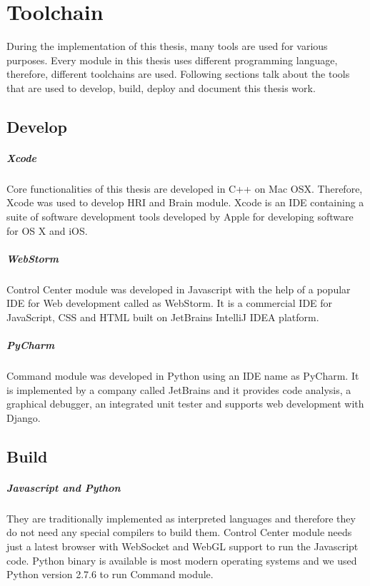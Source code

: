 \chapter{Toolchain} During the implementation of this thesis, many tools are used for various purposes. Every module in this thesis uses different programming language, therefore, different toolchains are used. Following sections talk about the tools that are used to develop, build, deploy and document this thesis work. 

\section*{Develop} 
\paragraph*{Xcode} Core functionalities of this thesis are developed in C++ on Mac OSX. Therefore, Xcode was used to develop HRI and Brain module. Xcode is an IDE containing a suite of software development tools developed by Apple for developing software for OS X and iOS.

\paragraph*{WebStorm} Control Center module was developed in Javascript with the help of a popular IDE for Web development called as WebStorm. It is a commercial IDE for JavaScript, CSS and HTML built on JetBrains IntelliJ IDEA platform.

\paragraph*{PyCharm} Command module was developed in Python using an IDE name as PyCharm. It is implemented by a company called JetBrains and it provides code analysis, a graphical debugger, an integrated unit tester and supports web development with Django.

\section*{Build} 
\paragraph*{Javascript and Python} They are traditionally implemented as interpreted languages and therefore they do not need any special compilers to build them. Control Center module needs just a latest browser with WebSocket and WebGL support to run the Javascript code. Python binary is available is most modern operating systems and we used Python version 2.7.6 to run Command module. 

